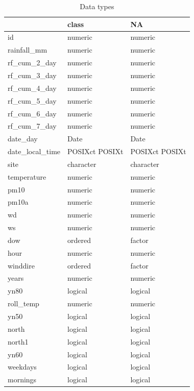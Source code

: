\documentclass[12pt]{article}
\begin{document}
\begin{table}

\caption{\label{tab:unnamed-chunk-4}Data types}
\centering
\begin{tabu} to 
\hline
  & class & NA\\
\hline
id & numeric & numeric\\
\hline
rainfall\_mm & numeric & numeric\\
\hline
rf\_cum\_2\_day & numeric & numeric\\
\hline
rf\_cum\_3\_day & numeric & numeric\\
\hline
rf\_cum\_4\_day & numeric & numeric\\
\hline
rf\_cum\_5\_day & numeric & numeric\\
\hline
rf\_cum\_6\_day & numeric & numeric\\
\hline
rf\_cum\_7\_day & numeric & numeric\\
\hline
date\_day & Date & Date\\
\hline
date\_local\_time & POSIXct POSIXt & POSIXct POSIXt\\
\hline
site & character & character\\
\hline
temperature & numeric & numeric\\
\hline
pm10 & numeric & numeric\\
\hline
pm10a & numeric & numeric\\
\hline
wd & numeric & numeric\\
\hline
ws & numeric & numeric\\
\hline
dow & ordered & factor\\
\hline
hour & numeric & numeric\\
\hline
winddire & ordered & factor\\
\hline
years & numeric & numeric\\
\hline
yn80 & logical & logical\\
\hline
roll\_temp & numeric & numeric\\
\hline
yn50 & logical & logical\\
\hline
north & logical & logical\\
\hline
north1 & logical & logical\\
\hline
yn60 & logical & logical\\
\hline
weekdays & logical & logical\\
\hline
mornings & logical & logical\\
\hline
\end{tabu}
\end{table}
\end{document}
